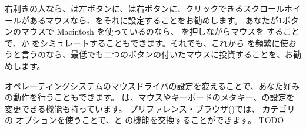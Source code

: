 \documentclass[a4paper,10pt,twoside]{book}
\begin{document}





右利きの人なら、\click は左ボタンに、\actclick は右ボタンに、クリックできるスクロールホイールがあるマウスなら、\metaclick をそれに設定することをお勧めします。
あなたが1ボタンのマウスで Macintosh を使っているのなら、\clover{} を押しながらマウスを \click することで、\actclick か \metaclick をシミュレートすることもできます。それでも、これから \pharo を頻繁に使おうと言うのなら、最低でも二つのボタンの付いたマウスに投資することを、お勧めします。

オペレーティングシステムのマウスドライバの設定を変えることで、あなた好みの動作を行うこともできます。
\pharo は、マウスやキーボードのメタキー、の設定を変更できる機能も持っています。
プリファレンス・ブラウザ()では、 カテゴリの  オプションを使うことで、\actclick と \metaclick の機能を交換することができます。
TODO
\end{document}
